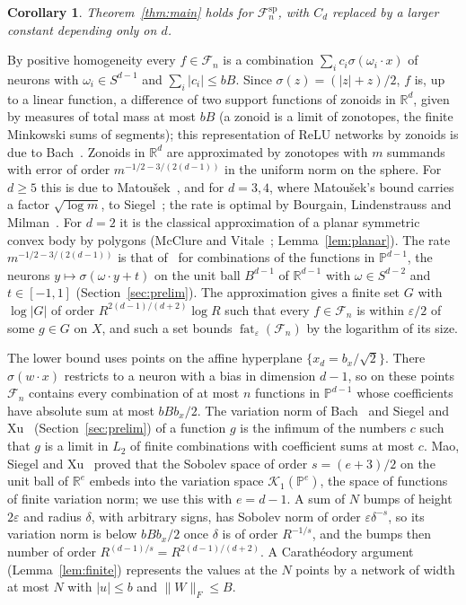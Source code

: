 \documentclass[11pt]{amsart}
\newtheorem{corollary}[theorem]{Corollary}
\theoremstyle{definition}
\theoremstyle{remark}
\numberwithin{equation}{section}
\newcommand{\RR}{\mathbb{R}}
\newcommand{\cF}{\mathcal{F}}
\newcommand{\cP}{\mathbb{P}}
\newcommand{\fat}{\operatorname{fat}}
\begin{document}
\begin{corollary}\label{cor:spectral}
Theorem~\ref{thm:main} holds for $\cF_n^{\mathrm{sp}}$, with $C_d$ replaced by a larger constant depending only on $d$.
\end{corollary}

By positive homogeneity every $f\in\cF_n$ is a combination $\sum_ic_i\sigma(\omega_i\cdot x)$ of neurons with $\omega_i\in S^{d-1}$ and $\sum_i|c_i|\le bB$. Since $\sigma(z)=(|z|+z)/2$, $f$ is, up to a linear function, a difference of two support functions of zonoids in $\RR^d$, given by measures of total mass at most $bB$ (a zonoid is a limit of zonotopes, the finite Minkowski sums of segments); this representation of ReLU networks by zonoids is due to Bach~\cite{Bach}. Zonoids in $\RR^d$ are approximated by zonotopes with $m$ summands with error of order $m^{-1/2-3/(2(d-1))}$ in the uniform norm on the sphere. For $d\ge5$ this is due to Matou\v{s}ek~\cite{Matousek}, and for $d=3,4$, where Matou\v{s}ek's bound carries a factor $\sqrt{\log m}$, to Siegel~\cite[Theorem~1]{Siegel}; the rate is optimal by Bourgain, Lindenstrauss and Milman~\cite{BLM}. For $d=2$ it is the classical approximation of a planar symmetric convex body by polygons (McClure and Vitale~\cite{MV}; Lemma~\ref{lem:planar}). The rate $m^{-1/2-3/(2(d-1))}$ is that of~\cite[Theorem~2]{Siegel} for combinations of the functions in $\cP^{d-1}$, the neurons $y\mapsto\sigma(\omega\cdot y+t)$ on the unit ball $B^{d-1}$ of $\RR^{d-1}$ with $\omega\in S^{d-2}$ and $t\in[-1,1]$ (Section~\ref{sec:prelim}). The approximation gives a finite set $G$ with $\log|G|$ of order $R^{2(d-1)/(d+2)}\log R$ such that every $f\in\cF_n$ is within $\varepsilon/2$ of some $g\in G$ on $X$, and such a set bounds $\fat_\varepsilon(\cF_n)$ by the logarithm of its size.

The lower bound uses points on the affine hyperplane $\{x_d=b_x/\sqrt2\}$. There $\sigma(w\cdot x)$ restricts to a neuron with a bias in dimension $d-1$, so on these points $\cF_n$ contains every combination of at most $n$ functions in $\cP^{d-1}$ whose coefficients have absolute sum at most $bBb_x/2$. The variation norm of Bach~\cite{Bach} and Siegel and Xu~\cite{SX} (Section~\ref{sec:prelim}) of a function $g$ is the infimum of the numbers $c$ such that $g$ is a limit in $L_2$ of finite combinations with coefficient sums at most $c$. Mao, Siegel and Xu~\cite{MSX} proved that the Sobolev space of order $s=(e+3)/2$ on the unit ball of $\RR^{e}$ embeds into the variation space $\mathcal K_1(\cP^e)$, the space of functions of finite variation norm; we use this with $e=d-1$. A sum of $N$ bumps of height $2\varepsilon$ and radius $\delta$, with arbitrary signs, has Sobolev norm of order $\varepsilon\delta^{-s}$, so its variation norm is below $bBb_x/2$ once $\delta$ is of order $R^{-1/s}$, and the bumps then number of order $R^{(d-1)/s}=R^{2(d-1)/(d+2)}$. A Carath\'eodory argument (Lemma~\ref{lem:finite}) represents the values at the $N$ points by a network of width at most $N$ with $|u|\le b$ and $\|W\|_F\le B$.
\end{document}
